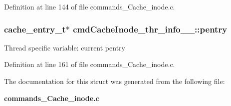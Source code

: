 Definition at line 144 of file commands\_\-Cache\_\-inode.c.
\subsubsection[{pentry}]{\setlength{\rightskip}{0pt plus 5cm}cache\_\-entry\_\-t$\ast$ {\bf cmdCacheInode\_\-thr\_\-info\_\-\_\-::pentry}}\label{structcmdCacheInode__thr__info_____c8b1fcf5c464d1edf0750189f7f39218}


Thread specific variable: current pentry 

Definition at line 161 of file commands\_\-Cache\_\-inode.c.

The documentation for this struct was generated from the following file:\begin{CompactItemize}
\item 
{\bf commands\_\-Cache\_\-inode.c}\end{CompactItemize}
